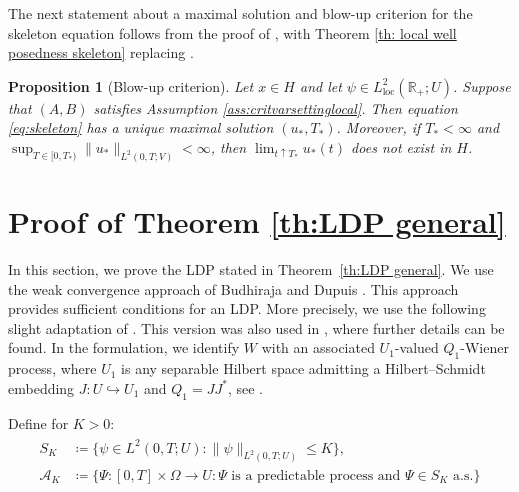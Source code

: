 \documentclass{amsart}
\newcommand{\<}{\langle}
\newcommand{\?}{\rangle}
\newcommand{\into}{\hookrightarrow}
\newcommand{\ceqq}{\coloneqq}
\newcommand{\col}{\colon}
\theoremstyle{plain}
\theoremstyle{remark}
\theoremstyle{plain}
\newtheorem{proposition}[theorem]{Proposition}
\numberwithin{equation}{section}
\def\R{{\mathbb R}}
\newcommand{\Om}{\Omega}
\begin{document}
The next statement about a maximal solution and blow-up criterion for the skeleton equation follows from the proof of  \cite[Prop.\ 3.15]{TV24}, with  Theorem \ref{th: local well posedness skeleton} replacing  \cite[Th.\ 3.7]{TV24}.  
\begin{proposition}[Blow-up criterion]\label{prop: blow up criterion}
  Let   $x\in H$ and let $\psi\in L^2_{\mathrm{loc}}(\R_+;U)$. Suppose that $(A,B)$ satisfies Assumption  \ref{ass:critvarsettinglocal}. Then  equation \eqref{eq:skeleton} has a unique maximal solution $(u_*,T_*)$. Moreover, if $T_*<\infty$ and $\sup_{T\in[0,T_*)}\|u_*\|_{L^2(0,T;V)}<\infty$, then $\lim_{t\uparrow T_*}u_*(t)$ does not exist in $H$.
\end{proposition}




\section{Proof of Theorem \ref{th:LDP general}}\label{sec: proofs}
 
In this section, we prove the LDP stated in Theorem~\ref{th:LDP general}.   
We use the weak convergence approach of Budhiraja and Dupuis \cite{budhidupuis01}. 
This approach provides sufficient conditions for an LDP. 
More precisely, we use the following slight adaptation of  \cite[Th.\ 3.2]{matoussi21}. This version was also used in \cite[Th.\ 4.5]{TV24}, where further details can be found. 
In the formulation, we identify $W$ with an associated $U_1$-valued $Q_1$-Wiener process, where $U_1$ is any separable Hilbert space admitting a Hilbert--Schmidt embedding $J\colon U\into U_1$ and $Q_1=JJ^*$, see \cite[(4.2), Prop.\ A.4]{TV24}.  

Define for $K>0$: 
\begin{align}\label{eq:SKAK}
\begin{split}
  S_K&\ceqq \{\psi\in L^2(0,T;U):\|\psi\|_{L^2(0,T;U)}\leq K\}, \\
  \mathcal{A}_K&\ceqq \{\Psi \col [0,T]\times \Om\to U : \Psi \text{ is a predictable process and }\Psi\in S_K \text{ a.s.}\}
\end{split}
\end{align}
\end{document}
